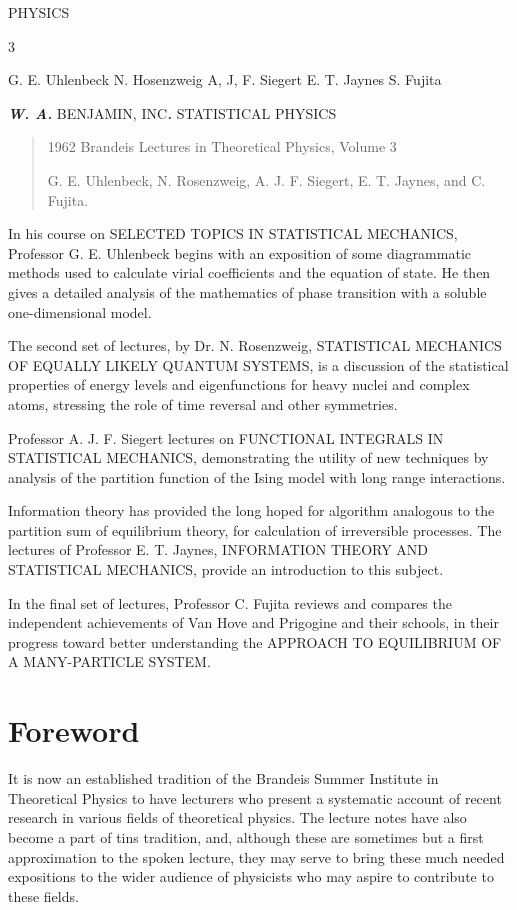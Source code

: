 \documentclass[]{article}
\begin{document}
PHYSICS

3

G. E. Uhlenbeck N. Hosenzweig A, J, F. Siegert E. T. Jaynes S. Fujita

\emph{\textbf{W. A.}} BENJAMIN, INC\emph{\textbf{.}} STATISTICAL PHYSICS

\begin{quote}
1962 Brandeis Lectures in Theoretical Physics, Volume 3

G. E. Uhlenbeck, N. Rosenzweig, A. J. F. Siegert, E. T. Jaynes, and C.
Fujita.
\end{quote}

In his course on SELECTED TOPICS IN STATISTICAL MECHANICS, Professor G.
E. Uhlenbeck begins with an exposition of some diagrammatic methods used
to calculate virial coefficients and the equation of state. He then
gives a detailed analysis of the mathematics of phase transition with a
soluble one-dimensional model.

The second set of lectures, by Dr. N. Rosenzweig, STATISTICAL MECHANICS
OF EQUALLY LIKELY QUANTUM SYSTEMS, is a discussion of the statistical
properties of energy levels and eigenfunctions for heavy nuclei and
complex atoms, stressing the role of time reversal and other symmetries.

Professor A. J. F. Siegert lectures on FUNCTIONAL INTEGRALS IN
STATISTICAL MECHANICS, demonstrating the utility of new techniques by
analysis of the partition function of the Ising model with long range
interactions.

Information theory has provided the long hoped for algorithm analogous
to the partition sum of equilibrium theory, for calculation of
irreversible processes. The lectures of Professor E. T. Jaynes,
INFORMATION THEORY AND STATISTICAL MECHANICS, provide an introduction to
this subject.

In the final set of lectures, Professor C. Fujita reviews and compares
the independent achievements of Van Hove and Prigogine and their
schools, in their progress toward better understanding the APPROACH TO
EQUILIBRIUM OF A MANY-PARTICLE SYSTEM.





\section*{Foreword}

It is now an established tradition of the Brandeis Summer Institute in
Theoretical Physics to have lecturers who present a systematic account
of recent research in various fields of theoretical physics. The lecture
notes have also become a part of tins tradition, and, although these are
sometimes but a first approximation to the spoken lecture, they may
serve to bring these much needed expositions to the wider audience of
physicists who may aspire to contribute to these fields.
\end{document}
